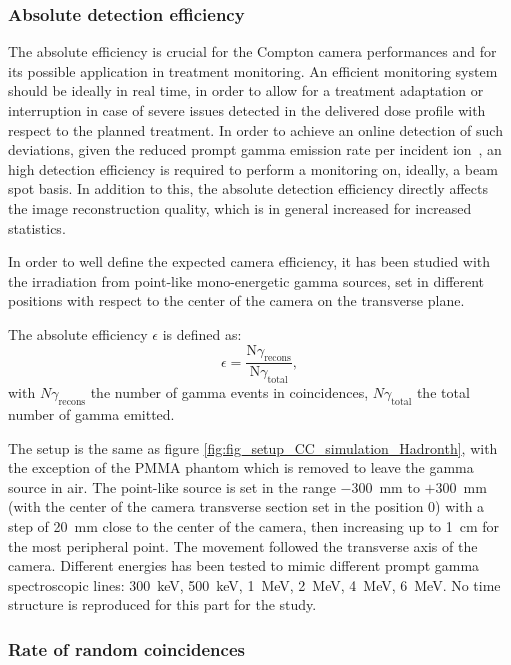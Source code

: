 \subsubsection{Absolute detection efficiency}
The absolute efficiency is crucial for the Compton camera performances and for its possible application in treatment monitoring. An efficient monitoring system should be ideally in real time, in order to allow for a treatment adaptation or interruption in case of severe issues detected in the delivered dose profile with respect to the planned treatment. In order to achieve an online detection of such deviations, given the reduced prompt gamma emission rate per incident ion~\cite{Ortega:2015aa}, an high detection efficiency is required to perform a monitoring on, ideally, a beam spot basis. In addition to this, the absolute detection efficiency directly affects the image reconstruction quality, which is in general increased for increased statistics.

In order to well define the expected camera efficiency, it has been studied with the irradiation from point-like mono-energetic gamma sources, set in different positions with respect to the center of the camera on the transverse plane.	

The absolute efficiency $\epsilon$ is defined as:
\begin{equation}
\epsilon =\frac{\mathrm{N}\gamma_{\mathrm{recons}}}{\mathrm{N}\gamma_{\mathrm{total}}},
\end{equation}
\label{eq:equation_efficacite_absolue}
with $N\gamma_{\mathrm{recons}}$ the number of gamma events in coincidences, $N\gamma_{\mathrm{total}}$ the total number of gamma emitted.

The setup is the same as figure \ref{fig:fig_setup_CC_simulation_Hadronth}, with the exception of the PMMA phantom which is removed to leave the gamma source in air.
The point-like source is set in the range $-300$~mm to $+300$~mm (with the center of the camera transverse section set in the position 0) with a step of 20~mm close to the center of the camera, then increasing up to 1~cm for the most peripheral point. The movement followed the transverse axis of the camera. Different energies has been tested to mimic different prompt gamma spectroscopic lines: 300~keV, 500~keV, 1~MeV, 2~MeV, 4~MeV, 6~MeV. No time structure is reproduced for this part for the study.

\subsubsection{Rate of random coincidences}

